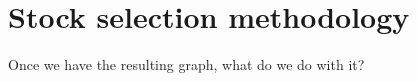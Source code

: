 \section{Stock selection methodology}
\label{sec:usage:stockselection}

Once we have the resulting graph, what do we do with it?